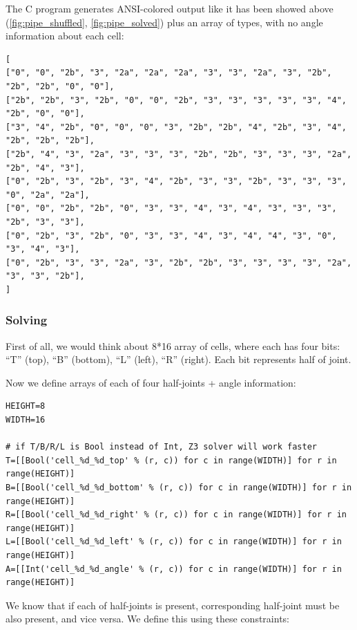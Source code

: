 The C program generates ANSI-colored output like it has been showed above (\ref{fig:pipe_shuffled}, \ref{fig:pipe_solved}) plus
an array of types, with no angle information about each cell:

\begin{lstlisting}[label=init_cells]
[
["0", "0", "2b", "3", "2a", "2a", "2a", "3", "3", "2a", "3", "2b", "2b", "2b", "0", "0"],
["2b", "2b", "3", "2b", "0", "0", "2b", "3", "3", "3", "3", "3", "4", "2b", "0", "0"],
["3", "4", "2b", "0", "0", "0", "3", "2b", "2b", "4", "2b", "3", "4", "2b", "2b", "2b"],
["2b", "4", "3", "2a", "3", "3", "3", "2b", "2b", "3", "3", "3", "2a", "2b", "4", "3"],
["0", "2b", "3", "2b", "3", "4", "2b", "3", "3", "2b", "3", "3", "3", "0", "2a", "2a"],
["0", "0", "2b", "2b", "0", "3", "3", "4", "3", "4", "3", "3", "3", "2b", "3", "3"],
["0", "2b", "3", "2b", "0", "3", "3", "4", "3", "4", "4", "3", "0", "3", "4", "3"],
["0", "2b", "3", "3", "2a", "3", "2b", "2b", "3", "3", "3", "3", "2a", "3", "3", "2b"],
]
\end{lstlisting}

\subsubsection{Solving}

First of all, we would think about 8*16 array of cells, where each has four bits:
``T'' (top),
``B'' (bottom),
``L'' (left),
``R'' (right).
Each bit represents half of joint.



Now we define arrays of each of four half-joints + angle information:

\begin{lstlisting}
HEIGHT=8
WIDTH=16

# if T/B/R/L is Bool instead of Int, Z3 solver will work faster
T=[[Bool('cell_%d_%d_top' % (r, c)) for c in range(WIDTH)] for r in range(HEIGHT)]
B=[[Bool('cell_%d_%d_bottom' % (r, c)) for c in range(WIDTH)] for r in range(HEIGHT)]
R=[[Bool('cell_%d_%d_right' % (r, c)) for c in range(WIDTH)] for r in range(HEIGHT)]
L=[[Bool('cell_%d_%d_left' % (r, c)) for c in range(WIDTH)] for r in range(HEIGHT)]
A=[[Int('cell_%d_%d_angle' % (r, c)) for c in range(WIDTH)] for r in range(HEIGHT)]
\end{lstlisting}

We know that if each of half-joints is present, corresponding half-joint must be also present, and vice versa.
We define this using these constraints:

